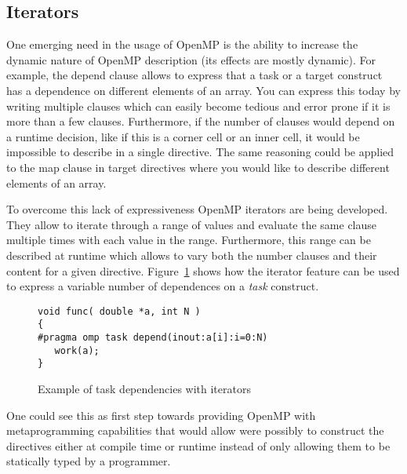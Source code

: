 \subsection{Iterators}
\label{sub:iterators}

One emerging need in the usage of OpenMP is the ability to increase the dynamic
nature of OpenMP description (its effects are mostly dynamic). For example, the
depend clause allows to express that a task or a target construct has
a dependence on different elements of an array. You can express this today by
writing multiple clauses which can easily become tedious and error prone if it
is more than a few clauses. Furthermore, if the number of clauses would depend
on a runtime decision, like if this is a corner cell or an inner cell, it would
be impossible to describe in a single directive. The same reasoning could be
applied to the map clause in target directives where you would like to describe
different elements of an array.
   
To overcome this lack of expressiveness OpenMP iterators are being developed.
They allow to iterate through a range of values and evaluate the same clause
multiple times with each value in the range. Furthermore, this range can be
described at runtime which allows to vary both the number clauses and their
content for a given directive. Figure~\ref{fig:iterators} shows how the iterator
feature can be used to express a variable number of dependences on a \emph{task}
construct.

\begin{figure}
\begin{verbatim}
void func( double *a, int N )
{
#pragma omp task depend(inout:a[i]:i=0:N)
   work(a);
}
\end{verbatim}
\caption{Example of task dependencies with iterators}
\label{fig:iterators}
\end{figure}
   
One could see this as first step towards providing OpenMP with metaprogramming
capabilities that would allow were possibly to construct the directives either
at compile time or runtime instead of only allowing them to be statically typed
by a programmer.


   

